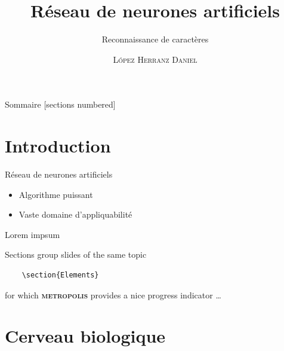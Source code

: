 \documentclass[10pt]{beamer}
\title{R\'eseau de neurones artificiels}
\subtitle{Reconnaissance de caract\`eres}
\date{}
\author{\textsc{L\'opez Herranz Daniel}}
\institute{Lyc\'ee Saint-Louis}
\newcommand{\themename}{\textbf{\textsc{metropolis}}\xspace}
\begin{document}
\maketitle

\begin{frame}{Sommaire}
  [sections numbered]
  \tableofcontents[hideallsubsections]
\end{frame}

\section{Introduction}

\begin{frame}[fragile]{R\'eseau de neurones artificiels}
	\begin{itemize}
		\item Algorithme puissant
		\item Vaste domaine d'appliquabilit\'e
	\end{itemize}
\end{frame}

\begin{frame}[fragile]{Lorem impsum}
  
  Sections group slides of the same topic

  \begin{verbatim}    \section{Elements}\end{verbatim}

  for which \themename provides a nice progress indicator \ldots
\end{frame}

\section{Cerveau biologique}
\end{document}

